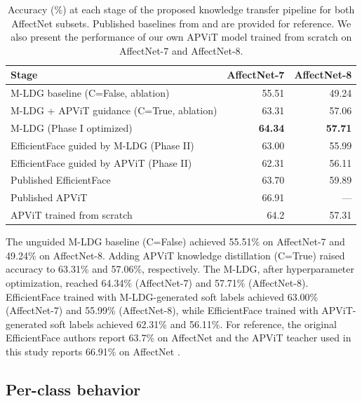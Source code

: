 \begin{table}[h!]
    \centering
    \begin{tabular}{@{}lrr@{}}
    \toprule
    \textbf{Stage} & \textbf{AffectNet-7} & \textbf{AffectNet-8} \\
    \midrule
    M-LDG baseline (C=False, ablation)             & 55.51 & 49.24 \\
    M-LDG + APViT guidance (C=True, ablation)      & 63.31 & 57.06 \\
    M-LDG (Phase I optimized)                    & \textbf{64.34} & \textbf{57.71} \\
    EfficientFace guided by M-LDG (Phase II)     & 63.00 & 55.99 \\
    EfficientFace guided by APViT (Phase II)     & 62.31 & 56.11 \\
    \midrule
    Published EfficientFace \cite{eff-face2021} & 63.70 & 59.89 \\
    Published APViT \cite{apvit2023}            & 66.91 & --- \\
    APViT trained from scratch                  & 64.2 & 57.31 \\
    \bottomrule
    \end{tabular}
    \caption[Cross-phase accuracy progression]{Accuracy (\%) at each stage of the proposed knowledge transfer pipeline for both AffectNet subsets. Published baselines from \cite{eff-face2021} and \cite{apvit2023} are provided for reference. We also present the performance of our own APViT model trained from scratch on AffectNet-7 and AffectNet-8.}
    \label{tab:results-progression}
\end{table}

The unguided M-LDG baseline (C=False) achieved 55.51\% on AffectNet-7 and 49.24\% on AffectNet-8. Adding APViT knowledge distillation (C=True) raised accuracy to 63.31\% and 57.06\%, respectively. The M-LDG, after hyperparameter optimization, reached 64.34\% (AffectNet-7) and 57.71\% (AffectNet-8). EfficientFace trained with M-LDG-generated soft labels achieved 63.00\% (AffectNet-7) and 55.99\% (AffectNet-8), while EfficientFace trained with APViT-generated soft labels achieved 62.31\% and 56.11\%. For reference, the original EfficientFace authors report 63.7\% on AffectNet \cite{eff-face2021} and the APViT teacher used in this study reports 66.91\% on AffectNet \cite{apvit2023}.

\subsection{Per-class behavior}
\label{section:results-metrics-perclass}

